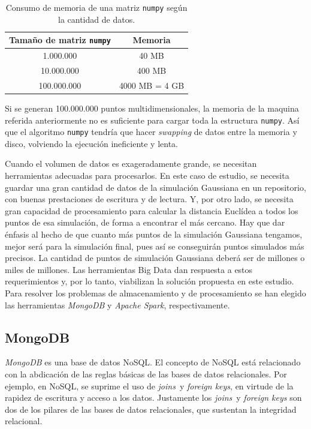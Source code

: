 \documentclass[11pt,spanish,listoffigures,listoftables]{tfgetsinf}
\begin{document}
        \begin{table}[H]
             \centering
             \begin{tabular}{|c|c|} 
                 \hline
                 Tamaño de matriz {\tt numpy} & Memoria \\ [0.5ex] 
                 \hline\hline
                 1.000.000 & 40 MB \\ 
                 \hline
                 10.000.000 & 400 MB \\ 
                 \hline
                 100.000.000 & 4000 MB = 4 GB \\ 
                 \hline
            \end{tabular}
            \caption{Consumo de memoria de una matriz {\tt numpy} según la cantidad de datos.}
            \label{table:memory}
        \end{table}
        
        Si se generan 100.000.000 puntos multidimensionales, la memoria de la maquina referida anteriormente no es suficiente para cargar toda la estructura {\tt numpy}. Así que el algoritmo {\tt numpy} tendría que hacer {\em swapping} de datos entre la memoria y disco, volviendo la ejecución ineficiente y lenta. 
        
        Cuando el volumen de datos es exageradamente grande, se necesitan herramientas adecuadas para procesarlos. En este caso de estudio, se necesita guardar una gran cantidad de datos de la simulación Gaussiana en un repositorio, con buenas prestaciones de escritura y de lectura. Y, por otro lado, se necesita gran capacidad de procesamiento para calcular la distancia Euclídea a todos los puntos de esa simulación, de forma a encontrar el más cercano. Hay que dar énfasis al hecho de que cuanto más puntos de la simulación Gaussiana tengamos, mejor será para la simulación final, pues así se conseguirán puntos simulados más precisos. La cantidad de puntos de simulación Gaussiana deberá ser de millones o miles de millones. Las herramientas Big Data dan respuesta a estos requerimientos y, por lo tanto, viabilizan la solución propuesta en este estudio. Para resolver los problemas de almacenamiento y de procesamiento se han elegido las herramientas {\em MongoDB} y {\em Apache Spark}, respectivamente.
        
        \subsection{MongoDB}
        {\em MongoDB} es una base de datos NoSQL. El concepto de NoSQL está relacionado con la abdicación de las reglas básicas de las bases de datos relacionales. Por ejemplo, en NoSQL, se suprime el uso de {\em joins} y {\em foreign keys}, en virtude de la rapidez de escritura y acceso a los datos. Justamente los {\em joins} y {\em foreign keys} son dos de los pilares de las bases de datos relacionales, que sustentan la integridad relacional. 
        
\end{document}
